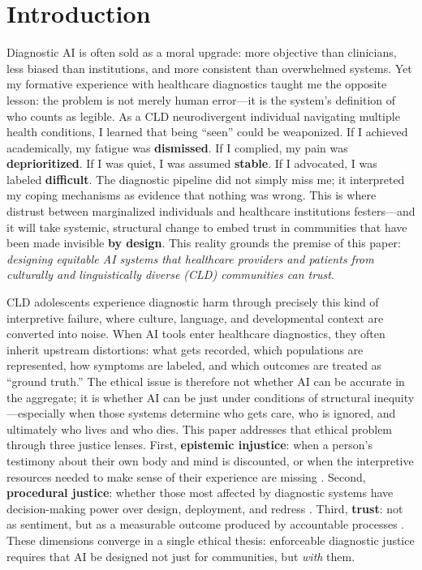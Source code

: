 \documentclass[12pt,a4paper]{article}
\begin{document}
\clearpage
\footnotesize\tableofcontents
\clearpage\normalsize




\section{Introduction}

Diagnostic AI is often sold as a moral upgrade: more objective than clinicians, less biased than institutions, and more consistent than overwhelmed systems. Yet my formative experience with healthcare diagnostics taught me the opposite lesson: the problem is not merely human error—it is the system’s definition of who counts as legible. As a CLD neurodivergent individual navigating multiple health conditions, I learned that being “seen” could be weaponized. If I achieved academically, my fatigue was \textbf{dismissed}. If I complied, my pain was \textbf{deprioritized}. If I was quiet, I was assumed \textbf{stable}. If I advocated, I was labeled \textbf{difficult}. The diagnostic pipeline did not simply miss me; it interpreted my coping mechanisms as evidence that nothing was wrong. This is where distrust between marginalized individuals and healthcare institutions festers—and it will take systemic, structural change to embed trust in communities that have been made invisible \textbf{by design}. This reality grounds the premise of this paper: \textit{designing equitable AI systems that healthcare providers and patients from culturally and linguistically diverse (CLD) communities can trust}.

\vspace{0.5em}
CLD adolescents experience diagnostic harm through precisely this kind of interpretive failure, where culture, language, and developmental context are converted into noise. When AI tools enter healthcare diagnostics, they often inherit upstream distortions: what gets recorded, which populations are represented, how symptoms are labeled, and which outcomes are treated as ``ground truth.'' The ethical issue is therefore not whether AI can be accurate in the aggregate; it is whether AI can be just under conditions of structural inequity—especially when those systems determine who gets care, who is ignored, and ultimately who lives and who dies. This paper addresses that ethical problem through three justice lenses. First, \textbf{epistemic injustice}: when a person’s testimony about their own body and mind is discounted, or when the interpretive resources needed to make sense of their experience are missing \citep{Nadarzynski2024}. Second, \textbf{procedural justice}: whether those most affected by diagnostic systems have decision-making power over design, deployment, and redress \citep{Lekadir2025}. Third, \textbf{trust}: not as sentiment, but as a measurable outcome produced by accountable processes \citep{Sagona2025}. These dimensions converge in a single ethical thesis: enforceable diagnostic justice requires that AI be designed not just for communities, but \textit{with} them.
\end{document}

